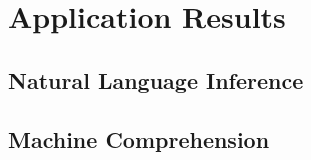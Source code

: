 \section{Application Results}
\subsection{Natural Language Inference}


\subsection{Machine Comprehension}
